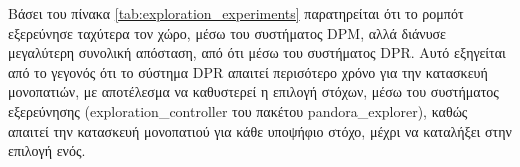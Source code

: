 Βάσει του πίνακα \ref{tab:exploration_experiments} παρατηρείται ότι το ρομπότ εξερεύνησε ταχύτερα τον χώρο, μέσω του συστήματος DPM, αλλά διάνυσε μεγαλύτερη συνολική απόσταση, από ότι μέσω του συστήματος DPR. Αυτό εξηγείται από το γεγονός ότι το σύστημα DPR απαιτεί περισότερο χρόνο για την κατασκευή μονοπατιών, με αποτέλεσμα να καθυστερεί η επιλογή στόχων, μέσω του συστήματος εξερεύνησης (exploration{\_}controller του πακέτου pandora{\_}explorer), καθώς απαιτεί την κατασκευή μονοπατιού για κάθε υποψήφιο στόχο, μέχρι να καταλήξει στην επιλογή ενός.





